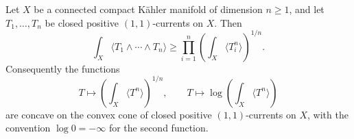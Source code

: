\begin{theorem}\label{thm:ordinary-mixed-mass-geometric-mean}
Let $X$ be a connected compact K\"ahler manifold of dimension $n\geq1$, and let $T_1,\ldots,T_n$ be closed positive $(1,1)$-currents on $X$. Then
\begin{equation}\label{eq:ordinary-mixed-mass-geometric-mean}
 \int_X\langle T_1\wedge\cdots\wedge T_n\rangle
       \geq\prod_{i=1}^n\left(\int_X\langle T_i^n\rangle\right)^{1/n}.
\end{equation}
Consequently the functions
\[
 T\longmapsto\left(\int_X\langle T^n\rangle\right)^{1/n},
 \qquad T\longmapsto\log\left(\int_X\langle T^n\rangle\right)
\]
are concave on the convex cone of closed positive $(1,1)$-currents on $X$, with the convention $\log0=-\infty$ for the second function.
\end{theorem}

